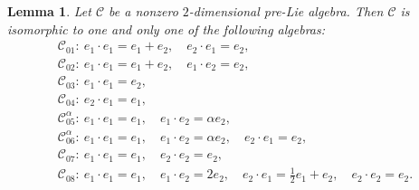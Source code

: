 \documentclass[10pt,a4paper]{amsart}
\numberwithin{equation}{section}
\newtheorem{Lemma}[Theorem]{Lemma}
\begin{document}
\begin{Lemma}
 Let $\mathcal{C}$ be a nonzero $2$-dimensional pre-Lie algebra.
Then $\mathcal{C}$ is isomorphic to one and only one of the following
algebras:
\begin{gather*}
 \mathcal{C}_{01} \colon\ e_{1} \cdot e_{1} = e_{1} + e_{2},\quad e_{2} \cdot e_{1} =e_{2},\\
 \mathcal{C}_{02} \colon\ e_{1}\cdot e_{1} = e_{1} + e_{2},\quad e_{1}\cdot e_{2} =e_{2}, \\
 \mathcal{C}_{03} \colon\ e_{1}\cdot e_{1} =e_{2}, \\
 \mathcal{C}_{04} \colon\ e_{2} \cdot e_{1} =e_{1}, \\
 \mathcal{C}_{05}^{\alpha} \colon\ e_{1}\cdot e_{1} =e_{1}, \quad e_{1}\cdot e_{2} = \alpha e_{2}, \\
 \mathcal{C}_{06}^{\alpha} \colon\ e_{1} \cdot e_{1} =e_{1}, \quad e_{1} \cdot e_{2} = \alpha e_{2},\quad e_{2} \cdot e_{1} =e_{2}, \\
 \mathcal{C}_{07} \colon\ e_{1}\cdot e_{1} =e_{1}, \quad e_{2}\cdot e_{2}=e_{2}, \\
 \mathcal{C}_{08} \colon\ e_{1}\cdot e_{1} =e_{1}, \quad e_{1}\cdot e_{2} = 2 e_{2}, \quad e_{2}\cdot e_{1} =\tfrac{1}{2} e_{1} + e_2, \quad e_{2}\cdot e_{2}=e_{2}.
\end{gather*}
\end{Lemma}
\end{document}
